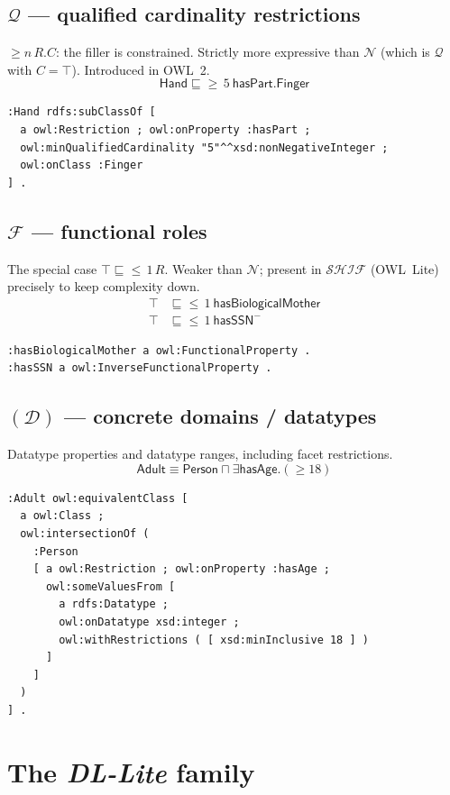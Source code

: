 \documentclass[11pt,a4paper]{article}
\newcommand{\dl}[1]{\ensuremath{\mathcal{#1}}}
\newcommand{\SHIF}{\dl{SHIF}}
\newcommand{\dlliteplain}{\textit{DL-Lite}}
\newcommand{\cn}[1]{\mathsf{#1}}      %
\newcommand{\rn}[1]{\mathsf{#1}}      %
\newcommand{\sub}{\sqsubseteq}
\newcommand{\eqv}{\equiv}
\newcommand{\inv}[1]{#1^{-}}
\newcommand{\dlaxiom}[1]{%
  \begin{displaymath}#1\end{displaymath}}
\begin{document}
\subsection*{\dl{Q} --- qualified cardinality restrictions}
$\geq n\,R.C$: the filler is constrained. Strictly more expressive than \dl{N}
(which is \dl{Q} with $C = \top$). Introduced in OWL~2.
\dlaxiom{\cn{Hand} \sub {\geq}\,5\ \rn{hasPart}.\cn{Finger}}
\begin{lstlisting}
:Hand rdfs:subClassOf [
  a owl:Restriction ; owl:onProperty :hasPart ;
  owl:minQualifiedCardinality "5"^^xsd:nonNegativeInteger ;
  owl:onClass :Finger
] .
\end{lstlisting}

\subsection*{\dl{F} --- functional roles}
The special case $\top \sub {\leq}\,1\,R$. Weaker than \dl{N}; present in
$\SHIF$ (OWL~Lite) precisely to keep complexity down.
\begin{align*}
  \top &\sub {\leq}\,1\ \rn{hasBiologicalMother}\\
  \top &\sub {\leq}\,1\ \inv{\rn{hasSSN}}
\end{align*}
\begin{lstlisting}
:hasBiologicalMother a owl:FunctionalProperty .
:hasSSN a owl:InverseFunctionalProperty .
\end{lstlisting}

\subsection*{$(\mathcal{D})$ --- concrete domains / datatypes}
Datatype properties and datatype ranges, including facet restrictions.
\dlaxiom{\cn{Adult} \eqv \cn{Person} \sqcap \exists \rn{hasAge}.({\geq}18)}
\begin{lstlisting}
:Adult owl:equivalentClass [
  a owl:Class ;
  owl:intersectionOf (
    :Person
    [ a owl:Restriction ; owl:onProperty :hasAge ;
      owl:someValuesFrom [
        a rdfs:Datatype ;
        owl:onDatatype xsd:integer ;
        owl:withRestrictions ( [ xsd:minInclusive 18 ] )
      ]
    ]
  )
] .
\end{lstlisting}

\section{The \dlliteplain{} family}
\label{sec:dllite}
\end{document}
